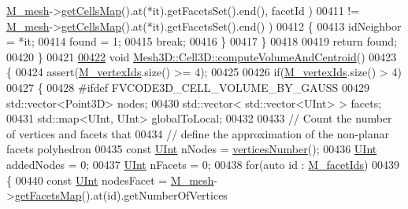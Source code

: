 \begin{DoxyCode}
      \hyperlink{classFVCode3D_1_1Mesh3D_1_1Cell3D_a5f593479ad61eb1a043b7ec977db39bb}{M\_mesh}->\hyperlink{classFVCode3D_1_1Mesh3D_ad904ef5e068c89951d77e9364e960bf3}{getCellsMap}().at(*it).getFacetsSet().end(), facetId )
00411             != \hyperlink{classFVCode3D_1_1Mesh3D_1_1Cell3D_a5f593479ad61eb1a043b7ec977db39bb}{M\_mesh}->\hyperlink{classFVCode3D_1_1Mesh3D_ad904ef5e068c89951d77e9364e960bf3}{getCellsMap}().at(*it).getFacetsSet().end() )
00412         \{
00413             idNeighbor = *it;
00414             found = 1;
00415             \textcolor{keywordflow}{break};
00416         \}
00417     \}
00418 
00419     \textcolor{keywordflow}{return} found;
00420 \}
00421 
\hypertarget{Mesh3D_8cpp_source.tex_l00422}{}\hyperlink{classFVCode3D_1_1Mesh3D_1_1Cell3D_ae4ba3b75f888448f83672fcef7d24f2c}{00422} \textcolor{keywordtype}{void} \hyperlink{classFVCode3D_1_1Mesh3D_1_1Cell3D_ae4ba3b75f888448f83672fcef7d24f2c}{Mesh3D::Cell3D::computeVolumeAndCentroid}()
00423 \{
00424     assert(\hyperlink{classFVCode3D_1_1Mesh3D_1_1Cell3D_a1c43369fa1a00208ff3293aad35a70aa}{M\_vertexIds}.size() >= 4);
00425 
00426     \textcolor{keywordflow}{if}(\hyperlink{classFVCode3D_1_1Mesh3D_1_1Cell3D_a1c43369fa1a00208ff3293aad35a70aa}{M\_vertexIds}.size() > 4)
00427     \{
00428 \textcolor{preprocessor}{#ifdef FVCODE3D\_CELL\_VOLUME\_BY\_GAUSS}
00429         std::vector<Point3D> nodes;
00430         std::vector< std::vector<UInt> > facets;
00431         std::map<UInt, UInt> globalToLocal;
00432 
00433         \textcolor{comment}{// Count the number of vertices and facets that}
00434         \textcolor{comment}{// define the approximation of the non-planar facets polyhedron}
00435         \textcolor{keyword}{const} \hyperlink{namespaceFVCode3D_a4bf7e328c75d0fd504050d040ebe9eda}{UInt} nNodes = \hyperlink{classFVCode3D_1_1Mesh3D_1_1Cell3D_a4877a883d7ae0abfe581809606ce260c}{verticesNumber}();
00436         \hyperlink{namespaceFVCode3D_a4bf7e328c75d0fd504050d040ebe9eda}{UInt} addedNodes = 0;
00437         \hyperlink{namespaceFVCode3D_a4bf7e328c75d0fd504050d040ebe9eda}{UInt} nFacets = 0;
00438         \textcolor{keywordflow}{for}(\textcolor{keyword}{auto} \textcolor{keywordtype}{id} : \hyperlink{classFVCode3D_1_1Mesh3D_1_1Cell3D_a1aa6b2a5119a2b94946f9a7dcfcb9478}{M\_facetIds})
00439         \{
00440             \textcolor{keyword}{const} \hyperlink{namespaceFVCode3D_a4bf7e328c75d0fd504050d040ebe9eda}{UInt} nodesFacet = \hyperlink{classFVCode3D_1_1Mesh3D_1_1Cell3D_a5f593479ad61eb1a043b7ec977db39bb}{M\_mesh}->\hyperlink{classFVCode3D_1_1Mesh3D_a76de387da2a552e3e1210d795bc7acf9}{getFacetsMap}().at(\textcolor{keywordtype}{id}).getNumberOfVertices

\end{DoxyCode}
